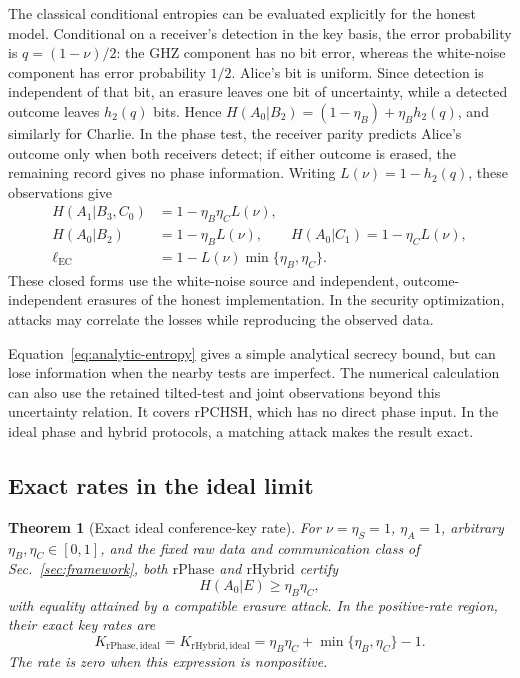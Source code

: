 \documentclass[aps,10pt,onecolumn,prx,superscriptaddress,longbibliography,nofootinbib]{revtex4-2}
\newcommand{\hbin}{h_2}
\newcommand{\EC}{\ell_{\mathrm{EC}}}
\newcommand{\rPCHSH}{\mathrm{rPCHSH}}
\newcommand{\rPhase}{\mathrm{rPhase}}
\newcommand{\rHybrid}{\mathrm{rHybrid}}
\newtheorem{theorem}{Theorem}
\begin{document}
The classical conditional entropies can be evaluated explicitly for the honest model. Conditional on a receiver's detection in the key basis, the error probability is $q=(1-\nu)/2$: the GHZ component has no bit error, whereas the white-noise component has error probability $1/2$. Alice's bit is uniform. Since detection is independent of that bit, an erasure leaves one bit of uncertainty, while a detected outcome leaves $\hbin(q)$ bits. Hence $H(A_0|B_2)=(1-\eta_B)+\eta_B\hbin(q)$, and similarly for Charlie. In the phase test, the receiver parity predicts Alice's outcome only when both receivers detect; if either outcome is erased, the remaining record gives no phase information. Writing $L(\nu)=1-\hbin(q)$, these observations give
\begin{align}
 H(A_1|B_3,C_0)&=1-\eta_B\eta_C L(\nu),\label{eq:phase-cost}\\
 H(A_0|B_2)&=1-\eta_B L(\nu),\qquad
 H(A_0|C_1)=1-\eta_C L(\nu),\label{eq:ternary-reconciliation}\\
 \EC&=1-L(\nu)\min\{\eta_B,\eta_C\}.
 \label{eq:target-ec}
\end{align}
These closed forms use the white-noise source and independent, outcome-independent erasures of the honest implementation. In the security optimization, attacks may correlate the losses while reproducing the observed data.

Equation~\eqref{eq:analytic-entropy} gives a simple analytical secrecy bound, but can lose information when the nearby tests are imperfect. The numerical calculation can also use the retained tilted-test and joint observations beyond this uncertainty relation. It covers $\rPCHSH$, which has no direct phase input. In the ideal phase and hybrid protocols, a matching attack makes the result exact.

\subsection{Exact rates in the ideal limit}

\begin{theorem}[Exact ideal conference-key rate]\label{thm:ideal-phase}
For \(\nu=\eta_S=1\), \(\eta_A=1\), arbitrary \(\eta_B,\eta_C\in[0,1]\), and the fixed raw data and communication class of Sec.~\ref{sec:framework}, both \(\rPhase\) and \(\rHybrid\) certify
\begin{equation}
 H(A_0|E)\geq\eta_B\eta_C,
 \label{eq:ideal-entropy}
\end{equation}
with equality attained by a compatible erasure attack. In the positive-rate region, their exact key rates are
\begin{equation}
 K_{\rPhase,\mathrm{ideal}}=K_{\rHybrid,\mathrm{ideal}}
 =\eta_B\eta_C+\min\{\eta_B,\eta_C\}-1.
 \label{eq:ideal-rate}
\end{equation}
The rate is zero when this expression is nonpositive.
\end{theorem}
\end{document}
